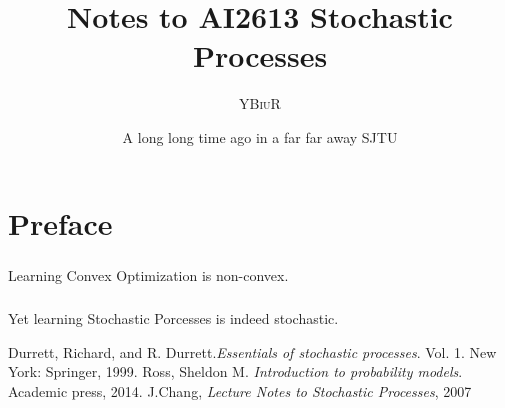 \documentclass[oneside]{book}
\title{Notes to AI2613 Stochastic Processes}
\author{\textsc{YBiuR}}
\date{A long long time ago in a far far away SJTU}
\theoremstyle{definition}
\theoremstyle{remark}
\begin{document}
\setlength{\parskip}{1em}
\setlength{\parindent}{0em}

\frontmatter
\maketitle
\chapter*{Preface}
\paragraph{}Learning Convex Optimization is non-convex.
\paragraph{}Yet learning Stochastic Porcesses is indeed stochastic.
\mainmatter
\tableofcontents
\begin{spacing}{1.2}







\begin{thebibliography}{9}
     Durrett, Richard, and R. Durrett.\textit{Essentials of stochastic processes}. Vol. 1. New York: Springer, 1999.
     Ross, Sheldon M. \textit{Introduction to probability models}. Academic press, 2014.
     J.Chang, \textit{Lecture Notes to Stochastic Processes}, 2007
\end{thebibliography}

\end{spacing}
\end{document}
